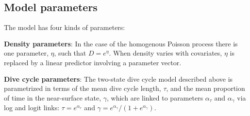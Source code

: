\documentclass[useAMS, usenatbib, referee]{biom}\usepackage[]{graphicx}\usepackage[]{color}
\newcommand{\dotomega}{\tilde{\omega}}
\begin{document}




\subsection{Model parameters}
\label{sec:model_parameters}

The model has four kinds of parameters:

\textbf{Density parameters}: In the case of the homogenous Poisson process there is one parameter, $\eta$, such that $D=e^{\eta}$. When density varies with covariates, $\eta$ is replaced by a linear predictor involving a parameter vector.

\textbf{Dive cycle parameters}: The two-state dive cycle model described above is parametrized in terms of the mean dive cycle length, $\tau$, and the mean proportion of time in the near-surface state, $\gamma$, which are linked to parameters $\alpha_\tau$ and $\alpha_\gamma$ via log and logit links: $\tau=e^{\alpha_\tau}$ and $\gamma=e^{\alpha_\gamma}/(1+e^{\alpha_\gamma})$.
\end{document}
